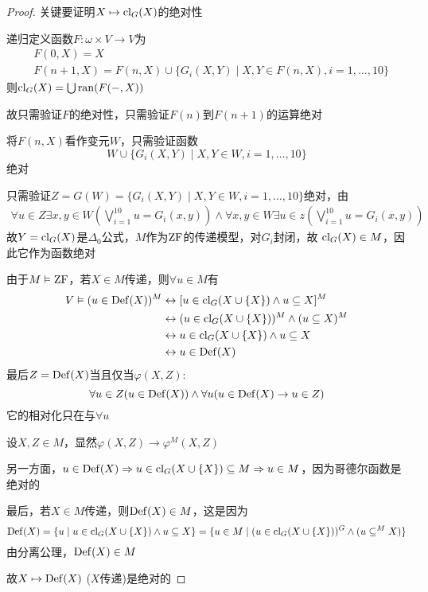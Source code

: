 \documentclass[11pt]{article}
\begin{document}
\begin{proof}
关键要证明\(X\mapsto\operatorname{\text{cl}}_G(X)\)的绝对性

递归定义函数\(F:\omega\times V\to V\)为
\begin{align*}
&F(0,X)=X\\
&F(n+1,X)=F(n,X)\cup\{G_i(X,Y)\mid X,Y\in F(n,X),i=1,\dots,10\}
\end{align*}
则\(\operatorname{\text{cl}}_G(X)=\bigcup\operatorname{ran}(F(-,X))\)

故只需验证\(F\)的绝对性，只需验证\(F(n)\)到\(F(n+1)\)的运算绝对

将\(F(n,X)\)看作变元\(W\)，只需验证函数
\begin{equation*}
W\cup\{G_i(X,Y)\mid X,Y\in W,i=1,\dots,10\}
\end{equation*}
绝对

只需验证\(Z=G(W)=\{G_i(X,Y)\mid X,Y\in W,i=1,\dots,10\}\)绝对，由
\begin{align*}
\forall u\in Z\exists x,y\in W(\bigvee_{i=1}^{10}u=G_i(x,y))\wedge
\forall x,y\in W\exists u\in z(\bigvee_{i=1}^{10}u=G_i(x,y))
\end{align*}
故\(Y=\operatorname{\text{cl}}_G(X)\)是\(\Delta_0\)公式，\(M\)作为\(\operatorname{ZF}\)的传递模型，对\(G_i\)封闭，故
\(\operatorname{\text{cl}}_G(X)\in M\)，因此它作为函数绝对

由于\(M\vDash\operatorname{ZF}\)，若\(X\in M\)传递，则\(\forall u\in M\)有
\begin{align*}
V\vDash(u\in\operatorname{Def}(X))^M&\leftrightarrow[u\in\operatorname{\text{cl}}_G(X\cup\{X\})\wedge u\subseteq X]^M\\
&\leftrightarrow(u\in\operatorname{\text{cl}}_G(X\cup\{X\}))^M\wedge(u\subseteq X)^M\\
&\leftrightarrow u\in\operatorname{\text{cl}}_G(X\cup\{X\})\wedge u\subseteq X\\
&\leftrightarrow u\in\operatorname{Def}(X)
\end{align*}
最后\(Z=\operatorname{Def}(X)\)当且仅当\(\varphi(X,Z)\):
\begin{equation*}
\forall u\in Z(u\in\operatorname{Def}(X))\wedge\forall u(u\in\operatorname{Def}(X)\to u\in Z)
\end{equation*}
它的相对化只在与\(\forall u\)

设\(X,Z\in M\)，显然\(\varphi(X,Z)\to\varphi^M(X,Z)\)

另一方面，\(u\in\operatorname{Def}(X)\Rightarrow u\in\operatorname{\text{cl}}_G(X\cup\{X\})\subseteq M\Rightarrow u\in M\)，因为哥德尔函数是绝对的

最后，若\(X\in M\)传递，则\(\operatorname{Def}(X)\in M\)，这是因为
\begin{equation*}
\operatorname{Def}(X)=\{u\mid u\in\operatorname{\text{cl}}_G(X\cup\{X\})\wedge u\subseteq X\}=\{u\in M\mid(u\in\operatorname{\text{cl}}_G(X\cup\{X\}))^G\wedge(u\subseteq^MX)\}
\end{equation*}
由分离公理，\(\operatorname{Def}(X)\in M\)

故\(X\mapsto\operatorname{Def}(X)\) (\(X\)传递)是绝对的
\end{proof}
\end{document}
